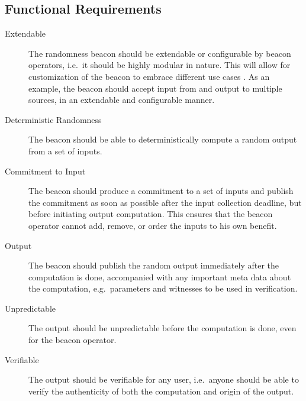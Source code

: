 \subsection{Functional Requirements}
\label{sub:functional_requirements}
\begin{description}
    \item[Extendable] The randomness beacon should be extendable or configurable by beacon operators, i.e.\ it should be highly modular in nature. This will allow for customization of the beacon to embrace different use cases . As an example, the beacon should accept input from and output to multiple sources, in an extendable and configurable manner.

    \item[Deterministic Randomness] The beacon should be able to deterministically compute a random output from a set of inputs.

    \item[Commitment to Input] The beacon should produce a commitment to a set of inputs and publish the commitment as soon as possible after the input collection deadline, but before initiating output computation. This ensures that the beacon operator cannot add, remove, or order the inputs to his own benefit.

    \item[Output] The beacon should publish the random output immediately after the computation is done, accompanied with any important meta data about the computation, e.g.\ parameters and witnesses to be used in verification.

    \item[Unpredictable] The output should be unpredictable before the computation is done, even for the beacon operator.

    \item[Verifiable] The output should be verifiable for any user, i.e.\ anyone should be able to verify the authenticity of both the computation and origin of the output.
\end{description}


